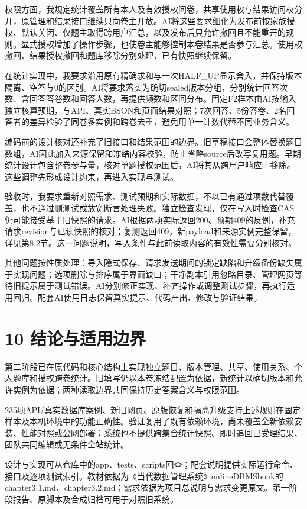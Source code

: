 权限方面，我规定统计覆盖所有本人及有效授权问卷，共享使用权与结果访问权分开，原管理和结果接口继续只向卷主开放。AI将这些要求细化为发布前按家族授权、默认关闭、仅题主取得跨用户汇总，以及发布后只允许撤回且不能重开的规则。显式授权增加了操作步骤，也使卷主能够控制本卷结果是否参与汇总。使用权撤回、结果授权撤回和题库移除分别处理，已有快照继续保留。

\newpage
在统计实现中，我要求沿用原有精确求和与一次HALF\_UP显示舍入，并保持版本隔离、空答与0的区别。AI将要求落实为确切sealed版本分组，分别统计回答次数、含回答答卷数和回答人数，再提供频数和区间分布。固定F2样本由AI按输入独立核算预期，与API、真实BSON和页面结果对照；7次回答、5份答卷、2名回答者的差异检验了同卷多实例和跨卷去重，避免用单一计数代替不同业务含义。

编码前的设计核对还补充了旧接口和结果范围的边界。旧草稿接口会整体替换题目数组，AI因此加入来源保留和冻结内容校验，防止省略source后改写复用题。早期统计设计包含整卷参与量，核对单题授权范围后，AI将其从跨用户响应中移除。这些调整先形成设计约束，再进入实现与测试。

验收时，我要求重新对照需求、测试预期和实际数据，不以已有通过项数代替覆盖，也不通过删测试或放宽断言处理失败。独立检查发现，仅在写入时检查CAS仍可能接受基于旧快照的请求。AI根据两项实际返回200、预期409的反例，补充请求revision与已读快照的核对；复测返回409，新payload和来源实例完整保留，详见第8.2节。这一问题说明，写入条件与此前读取内容的有效性需要分别核对。

其他问题按性质处理：导入隐式保存、请求发送期间的锁定缺陷和升级备份缺失属于实现问题；选项删除与排序属于界面缺口；干净副本引用忽略目录、管理网页等待旧提示属于测试错误。AI分别修正实现、补齐操作或调整测试步骤，再执行适用回归。配套AI使用日志保留真实提示、代码产出、修改与验证结果。

\section{10 结论与适用边界}\label{ux7ed3ux8bbaux4e0eux9002ux7528ux8fb9ux754c}

第二阶段已在原代码和核心结构上实现独立题目、版本管理、共享、使用关系、个人题库和授权跨卷统计。旧填写仍以本卷冻结配置为依据，新统计以确切版本和允许实例为依据；两种读取边界共同保持历史答案含义与权限范围。

235项API/真实数据库案例、新旧网页、原版恢复和隔离升级支持上述规则在固定样本及本机环境中的功能正确性。验证复用了既有依赖环境，尚未覆盖全新依赖安装、性能对照或公网部署；系统也不提供跨集合统计快照、即时追回已受理结果、团队共同编辑或无条件全站统计。

设计与实现可从仓库中的app、tests、scripts回查；配套说明提供实际运行命令、接口及逐项测试索引。教材依据为《当代数据管理系统》onlineDBMSbook的chapter3.1.md、chapter3.2.md；需求依据为项目总说明与需求变更原文。第一阶段报告、原脚本及合成归档可用于对照旧系统。
